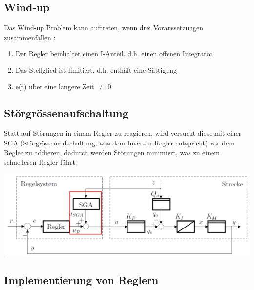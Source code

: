 \subsection{Wind-up}
Das Wind-up Problem kann auftreten, wenn drei Voraussetzungen zusammenfallen :
\begin{enumerate}[nosep]
	\item Der Regler beinhaltet einen I-Anteil. d.h. einen offenen Integrator
	\item Das Stellglied ist limitiert. d.h. enthält eine Sättigung
	\item e(t) über eine längere Zeit $\neq$ 0
\end{enumerate}

\subsection{Störgrössenaufschaltung}
Statt auf Störungen in einem Regler zu reagieren, wird versucht diese mit einer SGA (Störgrössenaufschaltung, was dem Inversen-Regler entspricht) vor dem Regler zu addieren, dadurch werden Störungen minimiert, was zu einem schnelleren Regler führt. 

\begin{center}
	\includegraphics[width=0.8\columnwidth]{Images/sga1}
\end{center}

\subsection{Implementierung von Reglern}
